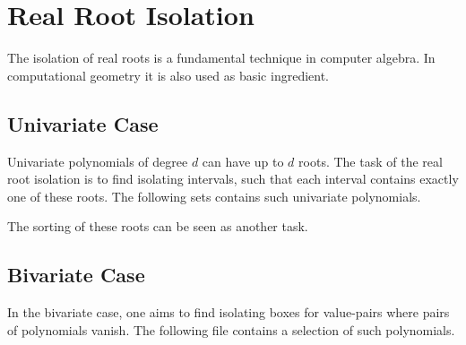 \section{Real Root Isolation\label{bi_sec:RealRootIsolation}}

The isolation of real roots is a fundamental technique in computer algebra.
In computational geometry it is also used as basic ingredient. 

\subsection{Univariate Case\label{bi_ssec:univariateisolation}}

Univariate polynomials of degree $d$ can have up to $d$ roots. The task
of the real root isolation is to find isolating intervals, such that each
interval contains exactly one of these roots. The following sets
contains such univariate polynomials.


The sorting of these roots can be seen as another task.

\subsection{Bivariate Case\label{bi_ssec:bivariateisolation}}

In the bivariate case, one aims to find isolating boxes for value-pairs
where pairs of polynomials vanish. The following file contains
a selection of such polynomials.

